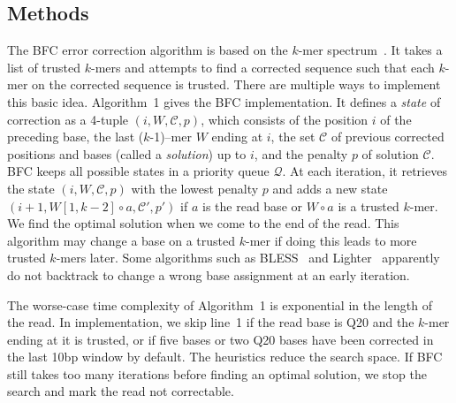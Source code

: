 \documentclass{bioinfo}
\begin{document}
\begin{methods}
\section{Methods}
The BFC error correction algorithm is based on the $k$-mer
spectrum~\citep{Pevzner:2001vn}. It takes a list of trusted $k$-mers and
attempts to find a corrected sequence such that each $k$-mer on the corrected
sequence is trusted. There are multiple ways to implement this basic idea.
Algorithm~1 gives the BFC implementation. It defines a \emph{state} of
correction as a 4-tuple $(i,W,\mathcal{C},p)$, which consists of the position
$i$ of the preceding base, the last \mbox{($k$-1)--mer} $W$ ending at
$i$, the set $\mathcal{C}$ of previous corrected positions and bases (called a
\emph{solution}) up to $i$, and the penalty $p$ of solution $\mathcal{C}$.  BFC
keeps all possible states in a priority queue $\mathcal{Q}$. At each iteration,
it retrieves the state $(i,W,\mathcal{C},p)$ with the lowest penalty $p$ and
adds a new state $(i+1,W[1,k-2]\circ a,\mathcal{C}',p')$ if $a$ is the read
base or $W\circ a$ is a trusted $k$-mer. We find the optimal solution when we
come to the end of the read. This algorithm may change a base on a trusted
$k$-mer if doing this leads to more trusted $k$-mers later. Some algorithms
such as BLESS~\citep{Heo:2014aa} and Lighter~\citep{Song:2014aa} apparently do
not backtrack to change a wrong base assignment at an early iteration.

The worse-case time complexity of Algorithm~1 is exponential in the length of
the read. In implementation, we skip line~1 if the read base is Q20 and the
$k$-mer ending at it is trusted, or if five bases or two Q20 bases have been
corrected in the last 10bp window by default. The heuristics reduce the
search space. If BFC still takes too many iterations before finding an optimal
solution, we stop the search and mark the read not correctable.


\end{methods}
\end{document}
